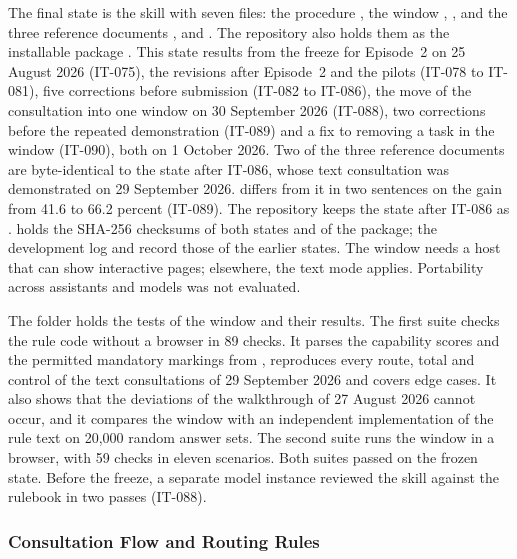The final state is the skill  with seven files: the procedure , the window , ,  and the three reference documents ,  and . The repository also holds them as the installable package . This state results from the freeze for Episode~2 on 25 August 2026 (\mbox{IT-075}), the revisions after Episode~2 and the pilots (\mbox{IT-078} to \mbox{IT-081}), five corrections before submission (\mbox{IT-082} to \mbox{IT-086}), the move of the consultation into one window on 30 September 2026 (\mbox{IT-088}), two corrections before the repeated demonstration (\mbox{IT-089}) and a fix to removing a task in the window (\mbox{IT-090}), both on 1 October 2026. Two of the three reference documents are byte-identical to the state after \mbox{IT-086}, whose text consultation was demonstrated on 29 September 2026.  differs from it in two sentences on the gain from 41.6 to 66.2 percent (\mbox{IT-089}). The repository keeps the state after \mbox{IT-086} as .  holds the SHA-256 checksums of both states and of the package; the development log and  record those of the earlier states. The window needs a host that can show interactive pages; elsewhere, the text mode applies. Portability across assistants and models was not evaluated.

The folder  holds the tests of the window and their results. The first suite checks the rule code without a browser in 89 checks. It parses the capability scores and the permitted mandatory markings from , reproduces every route, total and control of the text consultations of 29 September 2026 and covers edge cases. It also shows that the deviations of the walkthrough of 27 August 2026 cannot occur, and it compares the window with an independent implementation of the rule text on 20,000 random answer sets. The second suite runs the window in a browser, with 59 checks in eleven scenarios. Both suites passed on the frozen state. Before the freeze, a separate model instance reviewed the skill against the rulebook in two passes (\mbox{IT-088}).

\subsubsection{Consultation Flow and Routing Rules}
\label{app:artifact/procedure}

